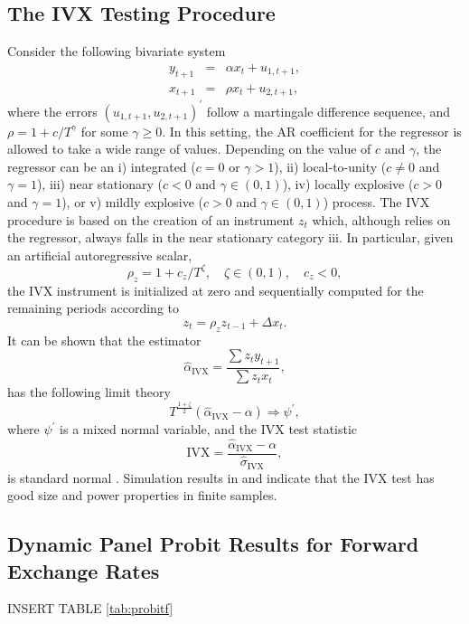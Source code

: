 \documentclass[11pt]{article}
\begin{document}
\begin{appendix}
\subsection{The IVX Testing Procedure}\label{app:ivx}
 

Consider the following bivariate system 
\begin{eqnarray}
y_{t+1} &=&\alpha x_{t}+u_{1,t+1},  \label{eq:bonf2} \\
x_{t+1} &=&\rho x_{t}+u_{2,t+1},
\end{eqnarray}%
where the errors $(u_{1,t+1},u_{2,t+1})^{\prime}$ follow a martingale difference sequence, and $\rho=1+c/T^\gamma$ for some $\gamma\geq0$. In this setting, the AR coefficient for the regressor is allowed to take a wide range of values. Depending on the value of $c$ and $\gamma$, the regressor can be an i) integrated ($c=0$ or $\gamma>1$), ii) local-to-unity  ($c\neq0$ and $\gamma=1$), iii) near stationary ($c<0$ and $\gamma \in (0,1)$), iv) locally explosive ($c>0$ and $\gamma=1$), or v) mildly explosive ($c>0$ and $\gamma \in (0,1)$) process. The IVX procedure is based on the creation of an instrument $z_t$ which, although relies on the regressor, always falls in the near stationary category iii. In particular, given an artificial autoregressive scalar,
\begin{equation}
\rho_{z}=1+c_{z}/T^\zeta, \quad \zeta \in (0,1), \quad c_{z}<0,
\end{equation}
the IVX instrument is initialized at zero and sequentially computed for the remaining periods according to 
\begin{equation}
z_t=\rho_{z}z_{t-1}+\Delta x_t.
\end{equation}
It can be shown that the estimator
\begin{equation}
\hat{\alpha}_{\text{IVX}}=\frac{\sum z_{t}y_{t+1}}{\sum z_t x_t},
\end{equation}
has the following limit theory
\[
T^{\frac{1+\zeta}{2}} (\hat{\alpha}_{\text{IVX}}-\alpha) \Longrightarrow \psi^{\prime},
\] 
where $\psi^{\prime}$ is a mixed normal variable, and the IVX test statistic
\[
\text{IVX}=\frac{\hat{\alpha}_{\text{IVX}}-\alpha}{\hat{\sigma}_{\text{IVX}}},
\]
is standard normal \citep{PhillipsM2009,KostakisMS2015,PhillipsL2013}. Simulation results in \citet{KostakisMS2015} and \citet{pavlidisPPf2017} indicate that the IVX test has good size and power properties in finite samples. 

\subsection{Dynamic Panel Probit Results for Forward Exchange Rates}\label{app:dpp}


\begin{center}
INSERT TABLE \ref{tab:probitf}
\end{center}

\end{appendix}
\end{document}
